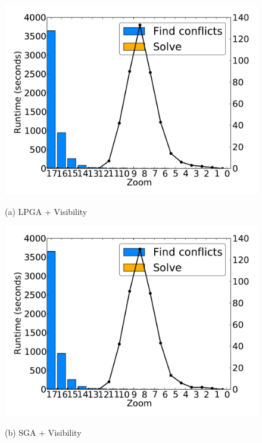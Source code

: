 \documentclass[11pt, oneside]{report}
\begin{document}
{\begin{figure}[tb]
  \begin{minipage}{0.329\linewidth}
    \centerline{\includegraphics[width=1\linewidth]{./figs-cvl/prelim_lin_30k_uswaterway_lp_A.pdf}}
    \centerline{(a) LPGA + Visibility}
  \end{minipage} \hfill
  \begin{minipage}{0.329\linewidth}
    \centerline{\includegraphics[width=1\linewidth]{./figs-cvl/prelim_lin_30k_uswaterway_heuristic_A.pdf}}
    \centerline{(b) SGA + Visibility}
  \end{minipage} \hfill
  \begin{minipage}{0.329\linewidth}

\end{minipage}
\end{figure}}
\end{document}
